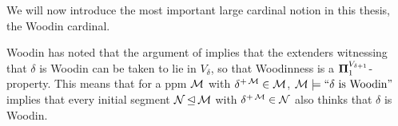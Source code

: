 We will now introduce the most important large cardinal notion in this thesis, the Woodin cardinal.



Woodin has noted that the argument of \cite[Theorem 4.1]{MitchellWoodin} implies that the extenders witnessing that $\delta$ is Woodin can be taken to lie in $V_\delta$, so that Woodinness is a ${\bf \Pi}_1^{V_{\delta+1}}$-property. This means that for a ppm $\operatorname{\mathcal{M}}$ with $\delta^{+\operatorname{\mathcal{M}}}\in\operatorname{\mathcal{M}}$, $\operatorname{\mathcal{M}}\models``\delta\text{ is Woodin}"$ implies that every initial segment $\operatorname{\mathcal{N}}\unlhd\operatorname{\mathcal{M}}$ with $\delta^{+\operatorname{\mathcal{M}}}\in\operatorname{\mathcal{N}}$ also thinks that $\delta$ is Woodin.

